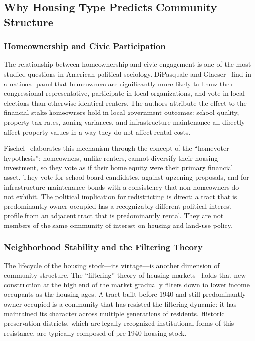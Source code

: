 \subsection{Why Housing Type Predicts Community Structure}

\subsubsection{Homeownership and Civic Participation}

The relationship between homeownership and civic engagement is one of the most
studied questions in American political sociology.
DiPasquale and Glaeser~\citeyearpar{dipasquale1999} find in a national panel
that homeowners are significantly more likely to know their congressional
representative, participate in local organizations, and vote in local elections
than otherwise-identical renters.
The authors attribute the effect to the financial stake homeowners hold in
local government outcomes: school quality, property tax rates, zoning variances,
and infrastructure maintenance all directly affect property values in a way
they do not affect rental costs.

Fischel~\citeyearpar{fischel2001} elaborates this mechanism through the concept
of the ``homevoter hypothesis'': homeowners, unlike renters, cannot diversify
their housing investment, so they vote as if their home equity were their
primary financial asset.
They vote for school board candidates, against upzoning proposals, and for
infrastructure maintenance bonds with a consistency that non-homeowners do not
exhibit.
The political implication for redistricting is direct: a tract that is
predominantly owner-occupied has a recognizably different political interest
profile from an adjacent tract that is predominantly rental.
They are not members of the same community of interest on housing and land-use
policy.

\subsubsection{Neighborhood Stability and the Filtering Theory}

The lifecycle of the housing stock---its vintage---is another dimension of
community structure.
The ``filtering'' theory of housing markets~\citep{rosenthal2014} holds that
new construction at the high end of the market gradually filters down to lower
income occupants as the housing ages.
A tract built before 1940 and still predominantly owner-occupied is a community
that has resisted the filtering dynamic: it has maintained its character across
multiple generations of residents.
Historic preservation districts, which are legally recognized institutional
forms of this resistance, are typically composed of pre-1940 housing stock.

